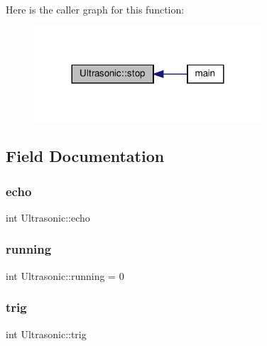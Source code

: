 Here is the caller graph for this function\+:
\nopagebreak
\begin{figure}[H]
\begin{center}
\leavevmode
\includegraphics[width=240pt]{classUltrasonic_ae5d433dfce8572b5cc1d75a909ae2c1c_icgraph}
\end{center}
\end{figure}


\subsection{Field Documentation}
\mbox{\label{classUltrasonic_a2979ecabfbda7cae5394eef20c862d99}} 
\subsubsection{\texorpdfstring{echo}{echo}}
{\footnotesize\ttfamily int Ultrasonic\+::echo\hspace{0.3cm}{\ttfamily [private]}}

\mbox{\label{classUltrasonic_a18088bcacb3c6080c08c2ea105313f65}} 
\subsubsection{\texorpdfstring{running}{running}}
{\footnotesize\ttfamily int Ultrasonic\+::running = 0\hspace{0.3cm}{\ttfamily [private]}}

\mbox{\label{classUltrasonic_a90f3f5b30f09038811bcc5231efdc619}} 
\subsubsection{\texorpdfstring{trig}{trig}}
{\footnotesize\ttfamily int Ultrasonic\+::trig\hspace{0.3cm}{\ttfamily [private]}}

